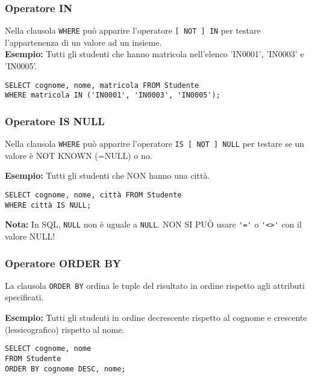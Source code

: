 \documentclass[a4paper, 10pt, titlepage]{article}
\begin{document}
	\subsubsection{Operatore IN}
		Nella clausola \lstinline|WHERE| può apparire l’operatore \lstinline|[ NOT ] IN| per testare
		l’appartenenza di un valore ad un insieme. \medskip \\
		\textbf{Esempio: }Tutti gli studenti che hanno matricola nell’elenco 'IN0001', 'IN0003' e
		'IN0005'.
		\begin{lstlisting}
SELECT cognome, nome, matricola FROM Studente
WHERE matricola IN ('IN0001', 'IN0003', 'IN0005');
		\end{lstlisting}
	
	\subsubsection{Operatore IS NULL}
		Nella clausola \lstinline|WHERE| può apparire l’operatore \lstinline|IS [ NOT ] NULL| per testare
		se un valore è NOT KNOWN (=NULL) o no.
	
		\noindent
		\textbf{Esempio: }Tutti gli studenti che NON hanno una città.
\begin{lstlisting}
SELECT cognome, nome, città FROM Studente
WHERE città IS NULL;
\end{lstlisting}
	\textbf{Nota: }In SQL, \lstinline|NULL| non è uguale a \lstinline|NULL|.
	NON SI PUÒ usare \lstinline|'='| o \lstinline|'<>'| con il valore NULL!
	
	\subsubsection{Operatore ORDER BY}
		La clausola \lstinline|ORDER BY| ordina le tuple del risultato in ordine rispetto agli
		attributi specificati.
		
		\noindent
		\textbf{Esempio: }Tutti gli studenti in ordine decrescente rispetto al cognome e crescente
		(lessicografico) rispetto al nome.
		\begin{lstlisting}
SELECT cognome, nome
FROM Studente
ORDER BY cognome DESC, nome;
		\end{lstlisting}
		
\end{document}
